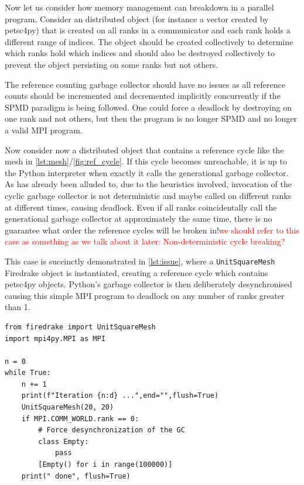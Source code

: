 \documentclass[10pt,journal,compsoc]{IEEEtran}
\newcommand{\jacknotes}[1]{\textcolor{red}{#1}}
\begin{document}
Now let us consider how memory management can breakdown in a parallel program. Consider an distributed object (for instance a vector created by petsc4py) that is created on all ranks in a communicator and each rank holds a different range of indices.
The object should be created collectively to determine which ranks hold which indices and should also be destroyed collectively to prevent the object persisting on some ranks but not others.

The reference counting garbage collector should have no issues as all reference counts should be incremented and decremented implicitly concurrently if the SPMD paradigm is being followed.
One could force a deadlock by destroying on one rank and not others, but then the program is no longer SPMD and no longer a valid MPI program.

Now consider now a distributed object that contains a reference cycle like the mesh in \cref{lst:mesh}/\cref{fig:ref_cycle}. If this cycle becomes unreachable, it is up to the Python interpreter when exactly it calls the generational garbage collector.
As has already been alluded to, due to the heuristics involved, invocation of the cyclic garbage collector is not deterministic and maybe called on different ranks at different times, causing deadlock.
Even if all ranks coincidentally call the generational garbage collector at approximately the same time, there is no guarantee what order the reference cycles will be broken in!\jacknotes{we should refer to this case as something as we talk about it later: Non-deterministic cycle breaking?}

This case is succinctly demonstrated in \cref{lst:issue}, where a \verb`UnitSquareMesh` Firedrake object is instantiated, creating a reference cycle which contains petsc4py objects. Python's garbage collector is then deliberately desynchronised causing this simple MPI program to deadlock on any number of ranks greater than 1.

\begin{lstlisting}[float={t}, caption={Example of code that forces a deadlock}, label={lst:issue}]
from firedrake import UnitSquareMesh
import mpi4py.MPI as MPI

n = 0
while True:
    n += 1
    print(f"Iteration {n:d} ...",end="",flush=True)
    UnitSquareMesh(20, 20)
    if MPI.COMM_WORLD.rank == 0:
        # Force desynchronization of the GC
        class Empty:
            pass
        [Empty() for i in range(100000)]
    print(" done", flush=True)
\end{lstlisting}
\end{document}

